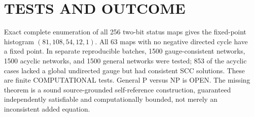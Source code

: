 \documentclass{article}
\begin{document}
\section{TESTS AND OUTCOME}
Exact complete enumeration of all 256 two-bit status maps gives the
fixed-point histogram $(81,108,54,12,1)$. All 63 maps with no negative
directed cycle have a fixed point. In separate reproducible batches, 1500
gauge-consistent networks, 1500 acyclic networks, and 1500 general networks
were tested; 853 of the acyclic cases lacked a global undirected gauge but
had consistent SCC solutions. These are finite COMPUTATIONAL tests.
General P versus NP is OPEN. The missing theorem is a sound source-grounded
self-reference construction, guaranteed independently satisfiable and
computationally bounded, not merely an inconsistent added equation.
\end{document}
